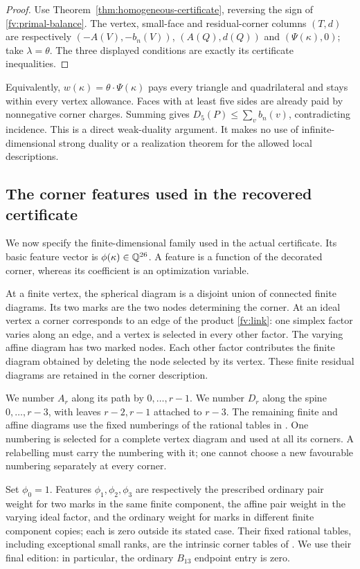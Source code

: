 \begin{proof}
Use Theorem~\ref{thm:homogeneous-certificate}, reversing the sign of
\eqref{fv:primal-balance}. The vertex, small-face and residual-corner
columns $(T,d)$ are respectively $(-A(V),-b_n(V))$,
$(A(Q),d(Q))$ and $(\Psi(\kappa),0)$; take $\lambda=\theta$.
The three displayed conditions are exactly its certificate inequalities.
\end{proof}

Equivalently, $w(\kappa)=\theta\cdot\Psi(\kappa)$ pays every triangle
and quadrilateral and stays within every vertex allowance. Faces with
at least five sides are already paid by nonnegative corner charges.
Summing gives $D_5(P)\le\sum_vb_n(v)$, contradicting incidence.
This is a direct weak-duality argument. It makes no use of
infinite-dimensional strong duality or a realization theorem for the
allowed local descriptions.

\subsection{The corner features used in the recovered certificate}
\label{fv:features}

We now specify the finite-dimensional family used in the actual
certificate. Its basic feature vector is
$\phi(\kappa)\in\mathbb Q^{26}$. A feature is a function of the decorated
corner, whereas its coefficient is an optimization variable.

At a finite vertex, the spherical diagram is a disjoint union of
connected finite diagrams. Its two marks are the two nodes determining
the corner. At an ideal vertex a corner corresponds to an edge of
the product \eqref{fv:link}: one simplex factor varies along an edge,
and a vertex is selected in every other factor. The varying affine
diagram has two marked nodes. Each other factor contributes the finite
diagram obtained by deleting the node selected by its vertex. These
finite residual diagrams are retained in the corner description.

We number $A_r$ along its path by $0,\ldots,r-1$. We number $D_r$
along the spine $0,\ldots,r-3$, with leaves $r-2,r-1$ attached to
$r-3$. The remaining finite and affine diagrams use the fixed
numberings of the rational tables in \cite{BoundsSupplement}.
One numbering is selected for a complete vertex diagram and used at
all its corners. A relabelling must carry the numbering with it; one
cannot choose a new favourable numbering separately at every corner.

Set $\phi_0=1$. Features $\phi_1,\phi_2,\phi_3$ are respectively
the prescribed ordinary pair weight for two marks in the same finite
component, the affine pair weight in the varying ideal factor, and
the ordinary weight for marks in different finite component copies;
each is zero outside its stated case. Their fixed rational tables,
including exceptional small ranks, are the intrinsic corner tables of
\cite{BoundsSupplement}. We use their final edition: in particular,
the ordinary $B_{13}$ endpoint entry is zero.

